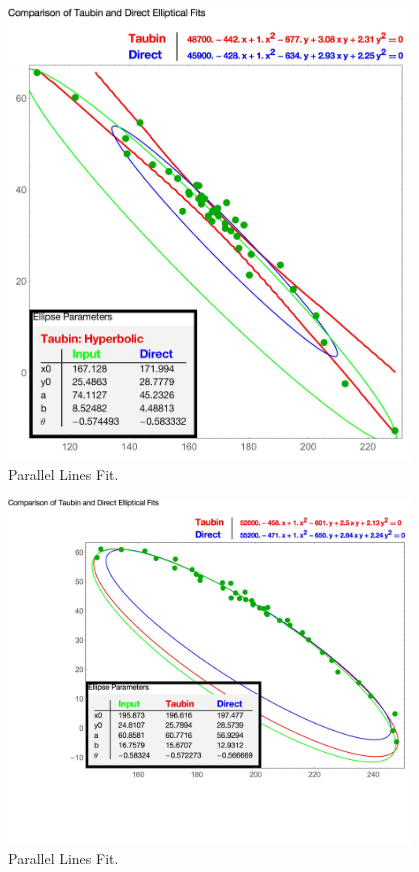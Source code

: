 \begin{figure}[h!]
  \centering
    \includegraphics[width=0.95\textwidth]{Chapter4/Figs/EllipticalFitTest_Hyperbolic_2.jpg}
    \caption{Parallel Lines Fit.}\label{fig:ParallelFit}
\end{figure}
\begin{figure}[h!]
  \centering
    \includegraphics[width=0.95\textwidth]{Chapter4/Figs/EllipticalFitTest_Taubin.jpg}
    \caption{Parallel Lines Fit.}\label{fig:ParallelFit}
\end{figure}
